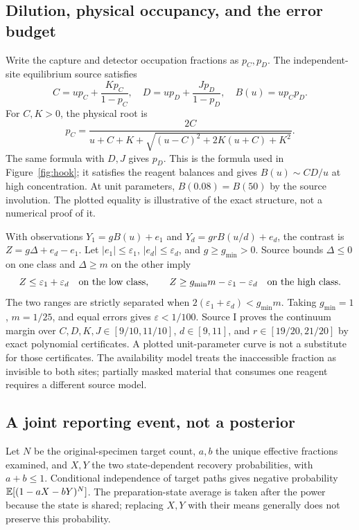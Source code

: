\subsection{Dilution, physical occupancy, and the error budget}\label{app:hook}
Write the capture and detector occupation fractions as $p_C,p_D$. The independent-site equilibrium source satisfies
\[
C=up_C+\frac{Kp_C}{1-p_C},\quad
D=up_D+\frac{Jp_D}{1-p_D},\quad B(u)=up_Cp_D.
\]
For $C,K>0$, the physical root is
\[
p_C=\frac{2C}{u+C+K+\sqrt{(u-C)^2+2K(u+C)+K^2}}.
\]
The same formula with $D,J$ gives $p_D$. This is the formula used in Figure~\ref{fig:hook}; it satisfies the reagent balances and gives $B(u)\sim CD/u$ at high concentration. At unit parameters, $B(0.08)=B(50)$ by the source involution. The plotted equality is illustrative of the exact structure, not a numerical proof of it.

With observations $Y_1=gB(u)+e_1$ and $Y_d=grB(u/d)+e_d$, the contrast is $Z=g\Delta+e_d-e_1$. Let $|e_1|\le\varepsilon_1$, $|e_d|\le\varepsilon_d$, and $g\ge g_{\min}>0$. Source bounds $\Delta\le0$ on one class and $\Delta\ge m$ on the other imply
\[
Z\le\varepsilon_1+\varepsilon_d\quad\hbox{on the low class},\qquad
Z\ge g_{\min}m-\varepsilon_1-\varepsilon_d\quad\hbox{on the high class}.
\]
The two ranges are strictly separated when $2(\varepsilon_1+\varepsilon_d)<g_{\min}m$. Taking $g_{\min}=1$, $m=1/25$, and equal errors gives $\varepsilon<1/100$. Source I proves the continuum margin over $C,D,K,J\in[9/10,11/10]$, $d\in[9,11]$, and $r\in[19/20,21/20]$ by exact polynomial certificates. A plotted unit-parameter curve is not a substitute for those certificates. The availability model treats the inaccessible fraction as invisible to both sites; partially masked material that consumes one reagent requires a different source model.

\subsection{A joint reporting event, not a posterior}\label{app:specimen}
Let $N$ be the original-specimen target count, $a,b$ the unique effective fractions examined, and $X,Y$ the two state-dependent recovery probabilities, with $a+b\le1$. Conditional independence of target paths gives negative probability $\mathbb E[(1-aX-bY)^N]$. The preparation-state average is taken after the power because the state is shared; replacing $X,Y$ with their means generally does not preserve this probability.

